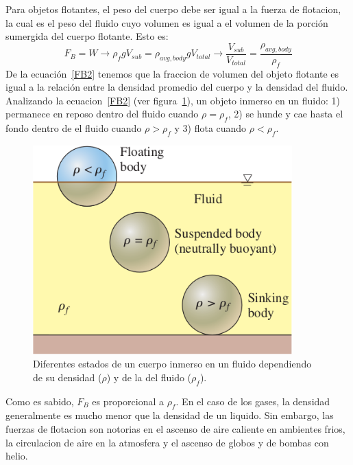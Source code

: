 \documentclass[10pt, oneside]{article}
\begin{document}
Para objetos flotantes, el peso del cuerpo debe ser igual a la fuerza de flotacion, la cual es el peso del fluido cuyo volumen es igual a el volumen de la porci\'on sumergida del cuerpo flotante. Esto es:
\begin{equation}
F_B = W \rightarrow \rho_f g V_{sub} = \rho_{avg,body}gV_{total} \rightarrow \frac{V_{sub}}{V_{total}} = \frac{\rho_{avg,body}}{\rho_f}
\label{FB2}
\end{equation}
De la ecuaci\'on~\ref{FB2} tenemos que la fraccion de volumen del objeto flotante es igual a la relaci\'on entre la densidad promedio del cuerpo y la densidad del fluido. Analizando la ecuacion~\ref{FB2} (ver figura~\ref{flota2}), un objeto inmerso en un fluido: 1) permanece en reposo dentro del fluido cuando $\rho = \rho_f$, 2) se hunde y cae hasta el fondo dentro de el fluido cuando $\rho > \rho_f$ y 3) flota cuando $\rho < \rho_f$.

\begin{figure}[h]
\centering
\includegraphics[width=10cm]{flota2}
\caption{ Diferentes estados de un cuerpo inmerso en un fluido dependiendo de su densidad ($\rho$) y de la del fluido ($\rho_f$).}
\label{flota2}
\end{figure}

Como es sabido, $F_B$ es proporcional a $\rho_f$. En el caso de los gases, la densidad generalmente es mucho menor que la densidad de un liquido. Sin embargo, las fuerzas de flotacion son notorias en el ascenso de aire caliente en ambientes frios, la circulacion de aire en la atmosfera y el ascenso de globos y de bombas con helio. 
\end{document}
